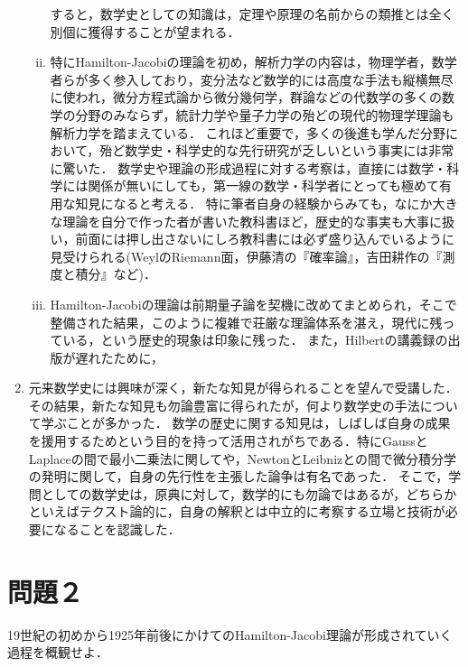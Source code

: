 \documentclass[uplatex, dvipdfmx]{jsarticle}
\begin{document}
\begin{enumerate}
\begin{enumerate}[(i)]
        すると，数学史としての知識は，定理や原理の名前からの類推とは全く別個に獲得することが望まれる．
        \item 特にHamilton-Jacobiの理論を初め，解析力学の内容は，物理学者，数学者らが多く参入しており，変分法など数学的には高度な手法も縦横無尽に使われ，微分方程式論から微分幾何学，群論などの代数学の多くの数学の分野のみならず，統計力学や量子力学の殆どの現代的物理学理論も解析力学を踏まえている．
        これほど重要で，多くの後進も学んだ分野において，殆ど数学史・科学史的な先行研究が乏しいという事実には非常に驚いた．
        数学史や理論の形成過程に対する考察は，直接には数学・科学には関係が無いにしても，第一線の数学・科学者にとっても極めて有用な知見になると考える．
        特に筆者自身の経験からみても，なにか大きな理論を自分で作った者が書いた教科書ほど，歴史的な事実も大事に扱い，前面には押し出さないにしろ教科書には必ず盛り込んでいるように見受けられる(WeylのRiemann面，伊藤清の『確率論』，吉田耕作の『測度と積分』など)．
        \item Hamilton-Jacobiの理論は前期量子論を契機に改めてまとめられ，そこで整備された結果，このように複雑で荘厳な理論体系を湛え，現代に残っている，という歴史的現象は印象に残った．
        また，Hilbertの講義録の出版が遅れたために，
    \end{enumerate}
    \item 元来数学史には興味が深く，新たな知見が得られることを望んで受講した．その結果，新たな知見も勿論豊富に得られたが，何より数学史の手法について学ぶことが多かった．
    数学の歴史に関する知見は，しばしば自身の成果を援用するためという目的を持って活用されがちである．特にGaussとLaplaceの間で最小二乗法に関してや，NewtonとLeibnizとの間で微分積分学の発明に関して，自身の先行性を主張した論争は有名であった．
    そこで，学問としての数学史は，原典に対して，数学的にも勿論ではあるが，どちらかといえばテクスト論的に，自身の解釈とは中立的に考察する立場と技術が必要になることを認識した．
\end{enumerate}

\section{問題２}

\begin{tcolorbox}[colframe=ForestGreen, colback=ForestGreen!10!white,breakable,colbacktitle=ForestGreen!40!white,coltitle=black,fonttitle=\bfseries\sffamily,
title=]
    19世紀の初めから1925年前後にかけてのHamilton-Jacobi理論が形成されていく過程を概観せよ．
\end{tcolorbox}
\end{document}
